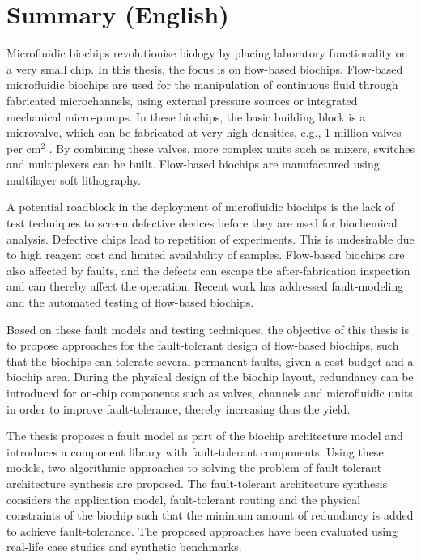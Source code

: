 \chapter{Summary (English)}

Microfluidic biochips revolutionise biology by placing laboratory functionality on a very small chip. In this thesis, the focus is on flow-based biochips. Flow-based microfluidic biochips are used for the manipulation of continuous fluid through fabricated microchannels, using external pressure sources or integrated mechanical micro-pumps. In these biochips, the basic building block is a microvalve, which can be fabricated at very high densities, e.g., 1 million valves per cm$^2$ \cite{wajid}. By combining these valves, more complex units such as mixers, switches and multiplexers can be built. Flow-based biochips are manufactured using multilayer soft lithography.

A potential roadblock in the deployment of microfluidic biochips is the lack of test techniques to screen defective devices before they are used for biochemical analysis. Defective chips lead to repetition of experiments. This is undesirable due to high reagent cost and limited availability of samples. Flow-based biochips are also affected by faults, and the defects can escape the after-fabrication inspection and can thereby affect the operation. Recent work has addressed fault-modeling and the automated testing of flow-based biochips.

Based on these fault models and testing techniques, the objective of this thesis is to propose approaches for the fault-tolerant design of flow-based biochips, such that the biochips can tolerate several permanent faults, given a cost budget and a biochip area. During the physical design of the biochip layout, redundancy can be introduced for on-chip components such as valves, channels and microfluidic units in order to improve fault-tolerance, thereby increasing thus the yield.

The thesis proposes a fault model as part of the biochip architecture model and introduces a component library with fault-tolerant components. Using these models, two algorithmic approaches to solving the problem of fault-tolerant architecture synthesis are proposed. The fault-tolerant architecture synthesis considers the application model, fault-tolerant routing and the physical constraints of the biochip such that the minimum amount of redundancy is added to achieve fault-tolerance. The proposed approaches have been evaluated using real-life case studies and synthetic benchmarks.